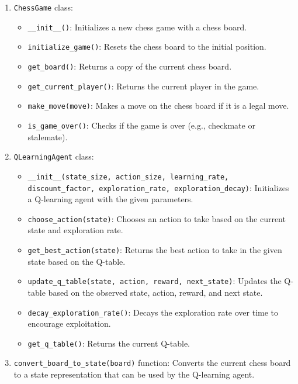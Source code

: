 \documentclass{article}
\begin{document}
\begin{enumerate}
  \item \texttt{ChessGame} class:
    \begin{itemize}
      \item \texttt{\_\_init\_\_()}: Initializes a new chess game with a chess board.
      \item \texttt{initialize\_game()}: Resets the chess board to the initial position.
      \item \texttt{get\_board()}: Returns a copy of the current chess board.
      \item \texttt{get\_current\_player()}: Returns the current player in the game.
      \item \texttt{make\_move(move)}: Makes a move on the chess board if it is a legal move.
      \item \texttt{is\_game\_over()}: Checks if the game is over (e.g., checkmate or stalemate).
    \end{itemize}
    
  \item \texttt{QLearningAgent} class:
    \begin{itemize}
      \item \texttt{\_\_init\_\_(state\_size, action\_size, learning\_rate, discount\_factor, exploration\_rate, exploration\_decay)}: Initializes a Q-learning agent with the given parameters.
      \item \texttt{choose\_action(state)}: Chooses an action to take based on the current state and exploration rate.
      \item \texttt{get\_best\_action(state)}: Returns the best action to take in the given state based on the Q-table.
      \item \texttt{update\_q\_table(state, action, reward, next\_state)}: Updates the Q-table based on the observed state, action, reward, and next state.
      \item \texttt{decay\_exploration\_rate()}: Decays the exploration rate over time to encourage exploitation.
      \item \texttt{get\_q\_table()}: Returns the current Q-table.
    \end{itemize}
    
  \item \texttt{convert\_board\_to\_state(board)} function: Converts the current chess board to a state representation that can be used by the Q-learning agent.
  

\end{enumerate}
\end{document}
